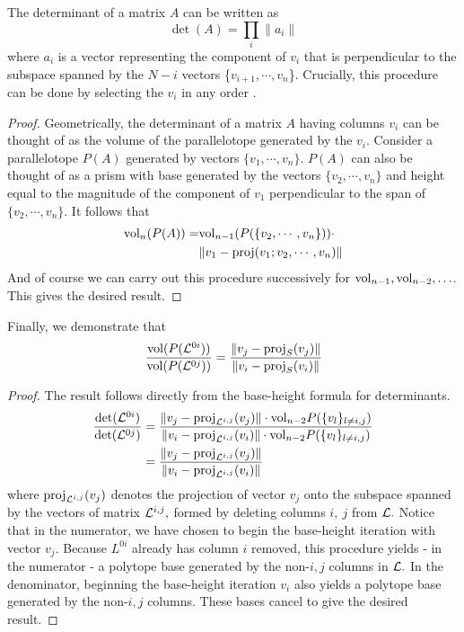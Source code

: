 \begin{fact}{The determinant of a matrix $A$ can be written as
\[
\det(A) = \prod_i \lVert a_i \rVert
\]
where ${a_i}$ is a vector representing the component of $v_i$ that is perpendicular to the subspace spanned by the $N-i$ vectors \{$v_{i+1},\cdots,v_n$\}.  Crucially, this procedure can be done by selecting the $v_i$ in any order \cite{Gover2010}.
\begin{proof}
Geometrically, the determinant of a matrix $A$ having columns $v_i$ can be thought of as the volume of the  parallelotope generated by the $v_i.$  Consider a parallelotope $P(A)$ generated by vectors $\{v_{1},\cdots,v_n\}.$  $P(A)$ can also be thought of as a prism with base generated by the vectors $\{v_{2},\cdots,v_n\}$ and height equal to the magnitude of the component of $v_1$ perpendicular to the span of $\{v_{2},\cdots,v_n\}$.  It follows that
\begin{eqnarray*}
{\rm vol}_n(P(A)) = &{\rm vol}_{n-1}(P(\{v_{2},\cdots,v_n\})) \cdot \\ &\lVert v_1 - {\rm proj}(v_1; v_{2},\cdots,v_n)  \rVert
\end{eqnarray*}
And of course we can carry out this procedure successively for ${\rm vol}_{n-1}, {\rm vol}_{n-2},\ldots$.  This gives the desired result.
\end{proof}
}
\end{fact}

\begin{prop}{Finally, we demonstrate that
\[
\frac{{{\rm vol}(P(\mathcal{L}^{0i}))}}{{{\rm vol}(P(\mathcal{L}^{0j}))}} = \frac{\left\lVert v_j - {\rm proj}_S(v_j)\right\rVert}{\left\lVert v_i - {\rm proj}_S(v_i)\right\rVert}
\]
}
\begin{proof}
The result follows directly from the base-height formula for determinants.
\[
\begin{aligned}
\frac{\det(\mathcal{L}^{0i})}{\det(\mathcal{L}^{0j})} &= \frac{\left\lVert v_j - {\rm proj}_{\mathcal{L}^{i,j}}(v_j)\right\rVert\cdot {\rm vol}_{n-2}P(\{v_l\}_{l\neq i,j})}{\left\lVert v_i - {\rm proj}_{\mathcal{L}^{i,j}}(v_i)\right\rVert\cdot {\rm vol}_{n-2}P(\{v_l\}_{l\neq i,j})}\\
 &= \frac{\left\lVert v_j - {\rm proj}_{\mathcal{L}^{i,j}}(v_j)\right\rVert}{\left\lVert v_i - {\rm proj}_{\mathcal{L}^{i,j}}(v_i)\right\rVert}
\end{aligned}
\]
where ${\rm proj}_{\mathcal{L}^{i,j}}(v_j)$ denotes the projection of vector $v_j$ onto the subspace spanned by the vectors of matrix ${\mathcal{L}^{i,j}},$ formed by deleting columns $i,\ j$ from $\mathcal{L}.$
Notice that in the numerator, we have chosen to begin the base-height iteration with vector $v_j.$  Because $L^{0i}$ already has column $i$ removed, this procedure yields - in the numerator - a polytope base generated by the non-$i,j$ columns in $\mathcal{L}.$  In the denominator, beginning the base-height iteration $v_i$ also yields a polytope base generated by the non-$i,j$ columns.  These bases cancel to give the desired result.
\end{proof}
\end{prop}




